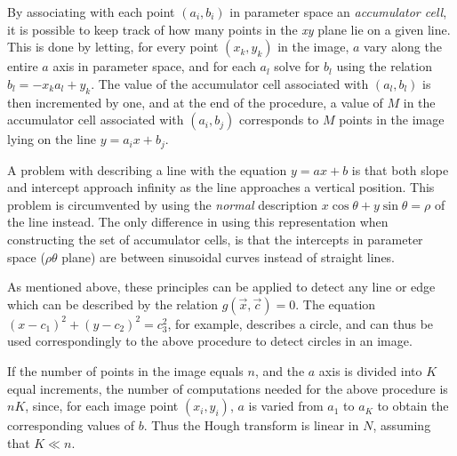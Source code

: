 By associating with each point $(a_{i},b_{i})$ in parameter space an
{\em accumulator cell\/}, it is possible to keep track of how many
points in the {\it xy\/} plane lie on a given line.  This is done by
letting, for every point $(x_{k},y_{k})$ in the image, $a$ vary along
the entire $a$ axis in parameter space, and for each $a_{l}$ solve for
$b_{l}$ using the relation $b_{l}=-x_{k}a_{l}+y_{k}$.  The value of
the accumulator cell associated with $(a_{l},b_{l})$ is then
incremented by one, and at the end of the procedure, a value of $M$ in
the accumulator cell associated with $(a_{i},b_{j})$ corresponds to
$M$ points in the image lying on the line $y=a_{i}x+b_{j}$.

A problem with describing a line with the equation $y=ax+b$ is that
both slope and intercept approach infinity as the line approaches a
vertical position.  This problem is circumvented by using the {\em
  normal\/} description $x\cos\theta+y\sin\theta=\rho$ of the line
instead.  The only difference in using this representation when
constructing the set of accumulator cells, is that the intercepts in
parameter space ($\rho\theta$ plane) are between sinusoidal curves
instead of straight lines.

As mentioned above, these principles can be applied to detect any line
or edge which can be described by the relation $g(\vec{x},\vec{c})=0$.
The equation $(x-c_{1})^{2}+(y-c_{2})^{2}=c_{3}^{2}$, for example,
describes a circle, and can thus be used correspondingly to the above
procedure to detect circles in an image.

If the number of points in the image equals $n$, and the $a$ axis is
divided into $K$ equal increments, the number of computations needed
for the above procedure is $nK$, since, for each image point
$(x_{i},y_{i})$, $a$ is varied from $a_{1}$ to $a_{K}$ to obtain the
corresponding values of $b$.  Thus the Hough transform is linear in
$N$, assuming that $K\ll n$.
